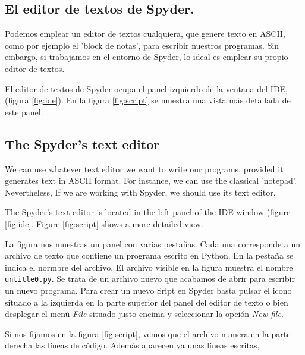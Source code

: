 \begin{paracol}{2}
\subsection{El editor de textos de Spyder.} 
Podemos emplear un editor de textos cualquiera, que genere texto en ASCII, como por ejemplo el 'block de notas', para escribir nuestros programas. Sin embargo, si trabajamos en el entorno de Spyder, lo ideal es emplear su propio editor de textos.

El editor de textos de Spyder ocupa el panel izquierdo de la ventana del IDE, (figura \ref{fig:ide}). En la figura \ref{fig:script} se muestra una vista más detallada de este panel.

\switchcolumn

\subsection{The Spyder's text editor}
We can use whatever text editor we want to write our programs, provided it generates text in ASCII format. For instance, we can use the classical 'notepad'. Nevertheless, If we are working with Spyder, we should use its text editor.

The Spyder's text editor is located in the left panel of the IDE window (figure \ref{fig:ide}. Figure \ref{fig:script} shows a more detailed view.

\switchcolumn
La figura nos muestras un panel con varias pestañas. Cada una corresponde a un archivo de texto que contiene un programa escrito en Python. En la pestaña se indica el normbre del archivo. El archivo visible en la figura muestra el nombre \texttt{untitle0.py}. Se trata de un archivo nuevo que acabamos de abrir para escribir un nuevo programa. Para crear un nuevo Sript en Spyder basta pulsar el icono situado a la izquierda en la parte superior del panel del editor de texto o bien desplegar el menú \emph{File} situado justo encima y seleccionar la opción \emph{New file}.

Si nos fijamos en la figura \ref{fig:script}, vemos que el archivo numera en la parte derecha las líneas de código. Además aparecen ya unas líneas escritas,


\end{paracol}
